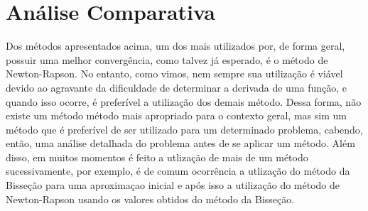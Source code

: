 \documentclass[a4paper, 10pt]{article} %
\theoremstyle{definition}
\theoremstyle{definition}
\numberwithin{equation}{section} %
\numberwithin{lstlisting}{section}
\numberwithin{algorithm}{section}
\numberwithin{table}{section}
\begin{document}
\section{Análise Comparativa}
Dos métodos apresentados acima, um dos mais utilizados por, de forma geral, possuir uma melhor convergência, como talvez já esperado, é o método de Newton-Rapson. No entanto, como vimos, nem sempre sua utilização é viável devido ao agravante da dificuldade de determinar a derivada de uma função, e quando isso ocorre, é preferível a utilização dos demais método. Dessa forma, não existe um método método mais apropriado para o contexto geral, mas sim um método que é preferível de ser utilizado para um determinado problema, cabendo, então, uma análise detalhada do problema antes de se aplicar um método. Além disso, em muitos momentos é feito a utlização de mais de um método sucessivamente, por exemplo, é de comum ocorrência a utlização do método da Bisseção para uma aproximaçao inicial e após isso a utilização do método de Newton-Rapson usando os valores obtidos do método da Bisseção.
\end{document}
